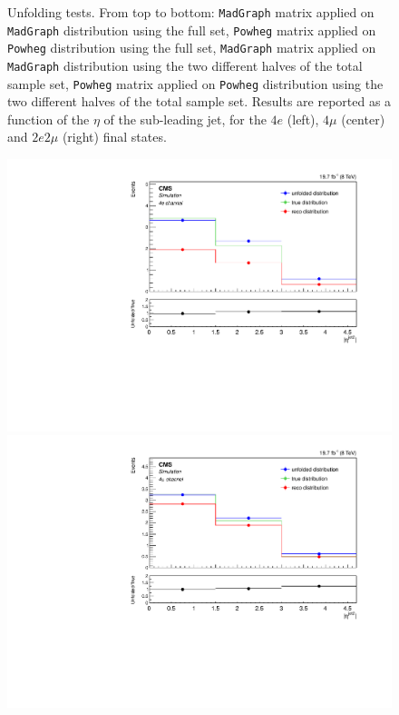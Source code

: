 \begin{figure}[hbtp]
\begin{center}
      \caption{Unfolding tests. From top to bottom: \texttt{MadGraph} matrix applied on \texttt{MadGraph} distribution using the full set, \texttt{Powheg} matrix applied on \texttt{Powheg} distribution using the full set,  \texttt{MadGraph} matrix applied on \texttt{MadGraph} distribution using the two different halves of the total sample set, \texttt{Powheg} matrix applied on \texttt{Powheg} distribution using the two different halves of the total sample set. Results are reported as a function of the $\eta$ of the sub-leading jet, for the $4e$ (left), $4\mu$ (center) and $2e2\mu$ (right) final states.}
    \label{fig:MCtest_EtaJet21}
  \end{center}
\end{figure}

\begin{figure}[hbtp]
  \begin{center}
    \includegraphics[width=0.8\cmsFigWidth]{Figures/Unfolding/MCTests/EtaJet2_ZZTo4e_MadMatrix_PowDistr_FullSample_fr}     
    \includegraphics[width=0.8\cmsFigWidth]{Figures/Unfolding/MCTests/EtaJet2_ZZTo4m_MadMatrix_PowDistr_FullSample_fr}     

\end{center}
\end{figure}
